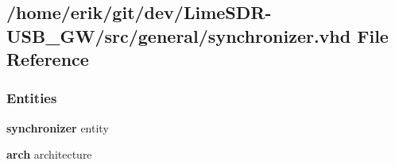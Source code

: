 \subsection{/home/erik/git/dev/\+Lime\+S\+D\+R-\/\+U\+S\+B\+\_\+\+G\+W/src/general/synchronizer.vhd File Reference}
\label{synchronizer_8vhd}
\subsubsection*{Entities}
\begin{DoxyCompactItemize}
\item 
{\bf synchronizer} entity
\item 
{\bf arch} architecture
\end{DoxyCompactItemize}
